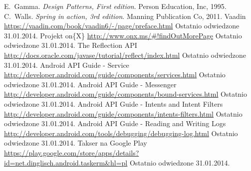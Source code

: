 \documentclass[11pt,a4paper,polish,thesis]{dcsbook}
\begin{document}
\backmatter

\begin{thebibliography}{1}
E.~Gamma. \emph{Design Patterns, First edition}. Person Education, Inc, 1995.
C.~Walls. \emph{Spring in action, 3rd edition}. Manning Publication Co, 2011.
Vaadin \url{https://vaadin.com/book/vaadin6/-/page/preface.html} Ostatnio odwiedzone 31.01.2014.
Projekt on\{X\} \url{http://www.onx.ms/#!findOutMorePage} Ostatnio odwiedzone 31.01.2014.
The Reflection API  \url{http://docs.oracle.com/javase/tutorial/reflect/index.html} Ostatnio odwiedzone 31.01.2014.
 Android API Guide - Service \url{http://developer.android.com/guide/components/services.html} Ostatnio odwiedzone 31.01.2014.
 Android API Guide - Messenger \url{http://developer.android.com/guide/components/bound-services.html} Ostatnio odwiedzone 31.01.2014.
 Android API Guide - Intents and Intent Filters \url{http://developer.android.com/guide/components/intents-filters.html} Ostatnio odwiedzone 31.01.2014.
 Android API Guide - Reading and Writing Logs \url{http://developer.android.com/tools/debugging/debugging-log.html} Ostatnio odwiedzone 31.01.2014.
Takser na Google Play \url{https://play.google.com/store/apps/details?id=net.dinglisch.android.taskerm&hl=pl} Ostatnio odwiedzone 31.01.2014.
\end{thebibliography}
\end{document}
